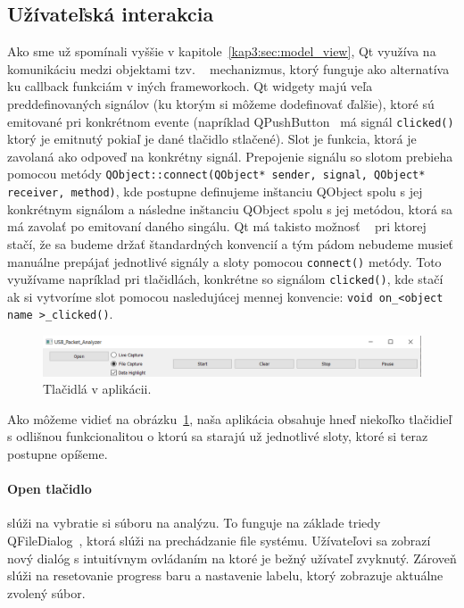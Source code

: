 \subsection{Užívateľská interakcia}
Ako sme už spomínali vyššie v kapitole~\ref{kap3:sec:model_view}, Qt využíva na komunikáciu medzi objektami tzv. ~\cite{signal_slot} mechanizmus, ktorý funguje ako alternatíva ku callback funkciám v iných frameworkoch. Qt widgety majú veľa preddefinovaných signálov (ku ktorým si môžeme dodefinovať ďalšie), ktoré sú emitované pri konkrétnom evente (napríklad QPushButton~\cite{qpushbutton} má signál \texttt{clicked()} ktorý je emitnutý pokiaľ je dané tlačidlo stlačené). Slot je funkcia, ktorá je zavolaná ako odpoveď na konkrétny signál. Prepojenie signálu so slotom prebieha pomocou metódy \texttt{QObject::connect(QObject* sender, signal, QObject* receiver, method)}, kde postupne definujeme inštanciu QObject spolu s jej konkrétnym signálom a následne inštanciu QObject spolu s jej metódou, ktorá sa má zavolať po emitovaní daného singálu. Qt má takisto možnosť ~\cite{qt_autoconnect} pri ktorej stačí, že sa budeme držať štandardných konvencií a tým pádom nebudeme musieť manuálne prepájať jednotlivé signály a sloty pomocou \texttt{connect()} metódy. Toto využívame napríklad pri tlačidlách, konkrétne so signálom \texttt{clicked()}, kde stačí ak si vytvoríme slot pomocou nasledujúcej mennej konvencie: \texttt{void on\_\textless object name \textgreater\_clicked()}.

\begin{figure}[!htb]
	\centering
	\includegraphics[width=\textwidth]{img/kap04_arch_buttons}
	\caption{Tlačidlá v aplikácii.}
	\label{obr:kap4:arch:buttons}
\end{figure}

Ako môžeme vidieť na obrázku~\ref{obr:kap4:arch:buttons}, naša aplikácia obsahuje hneď niekoľko tlačidieľ s odlišnou funkcionalitou o ktorú sa starajú už jednotlivé sloty, ktoré si teraz postupne opíšeme.

\paragraph{Open tlačidlo}
\label{kap04:sec:open_button}

slúži na vybratie si súboru na analýzu. To funguje na základe triedy QFileDialog~\cite{qfiledialog}, ktorá slúži na prechádzanie file systému. Užívateľovi sa zobrazí nový dialóg s intuitívnym ovládaním na ktoré je bežný užívateľ zvyknutý. Zároveň slúži na resetovanie progress baru a nastavenie labelu, ktorý zobrazuje aktuálne zvolený súbor.

